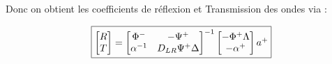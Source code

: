 \documentclass[12pt,a4paper]{article}
\begin{document}
\begin{sol}
\begin{minipage}[t]{18.5cm}
			Donc on obtient les coefficients de réflexion et Transmission des ondes via :
			
			\[
			\fbox{$\begin{bmatrix}
				R \\
				T
			\end{bmatrix} = \begin{bmatrix}
			\Phi^- & -\Psi^+ \\
			\alpha^{-1} & D_{LR}\Psi^+ \Delta
			\end{bmatrix}^{-1}\begin{bmatrix}
			-\Phi^+\Lambda\\
			-\alpha^+
			\end{bmatrix}a^+$}
			\]
		\end{minipage}
	\end{sol}
	
\end{document}
